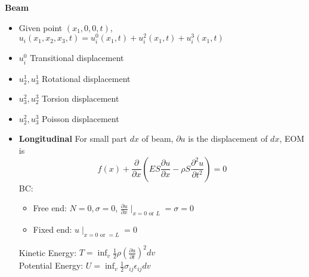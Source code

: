 \documentclass{article}
\begin{document}
\begin{multicols*}{2}
  \noindent\textbf{Beam}
  \begin{itemize}
  \item Given point $(x_1, 0, 0, t)$, $u_i(x_1, x_2, x_3, t) = u_i^0(x_1,t) + u_i^2(x_1,t) + u_i^3(x_1,t)$
  \item $u_i^0$ Transitional displacement
  \item $u_2^1, u_3^1$ Rotational displacement
  \item $u_3^2, u_2^3$ Torsion displacement
  \item $u_2^2, u_3^3$ Poisson displacement
  \item \textbf{Longitudinal} For small part $dx$ of beam, $\partial u$ is the displacement of $dx$, EOM is
    \begin{equation*}
      f(x) + \frac{\partial}{\partial x}(ES\frac{\partial u}{\partial x} -\rho S\frac{\partial^2 u}{\partial t^2}) = 0
    \end{equation*}
    BC:
    \begin{itemize}
    \item Free end: $N=0, \sigma=0$, $\frac{\partial u}{\partial x}\mid_{x=0 \text{ or } L} = \sigma = 0$
    \item Fixed end: $u\mid_{x=0 \text{ or } = L} = 0$
    \end{itemize}
    Kinetic Energy: $T = \inf_v \frac{1}{2} \rho (\frac{\partial u}{\partial t})^2 dv$\\
    Potential Energy: $U = \inf_v \frac{1}{2}\sigma_{ij} \epsilon_{ij} dv$


\end{itemize}
\end{multicols*}
\end{document}
